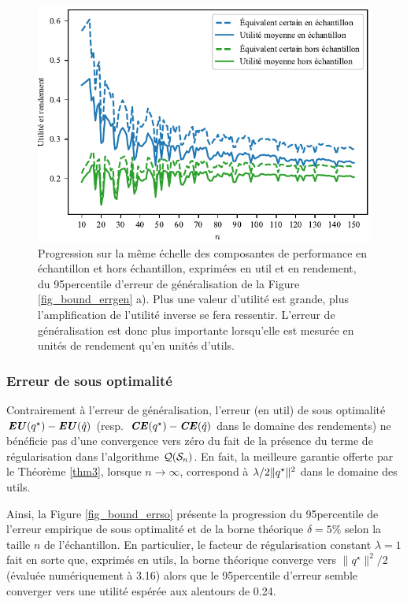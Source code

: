 \begin{figure}[h!]
  \centering
  \includegraphics[width=\textwidth]{../experiments/fig/bound_gencomps.pdf}
  \caption[Composantes de l'erreur maximale]{Progression sur la même échelle des
    composantes de performance en échantillon et hors échantillon, exprimées en util et en
    rendement, du 95\ieme percentile d'erreur de généralisation de la Figure
    \ref{fig_bound_errgen} a). Plus une valeur d'utilité est grande, plus l'amplification
    de l'utilité inverse se fera ressentir. L'erreur de généralisation est donc plus
    importante lorsqu'elle est mesurée en unités de rendement qu'en unités d'utils.  }
  \label{fig_bound_gencomps}
\end{figure}

\clearpage


\subsubsection{Erreur de sous optimalité}

Contrairement à l'erreur de généralisation, l'erreur (en util) de sous optimalité
$\operatorname{\mbox{\textbf{\textit{EU}}}}(q^\star) - \operatorname{\mbox{\textbf{\textit{EU}}}}(\hat q)$ (resp.~$\operatorname{\mbox{\textbf{\textit{CE}}}}(q^\star) - \operatorname{\mbox{\textbf{\textit{CE}}}}(\hat q)$ dans le domaine des rendements) ne
bénéficie pas d'une convergence vers zéro du fait de la présence du terme de
régularisation dans l'algorithme $\mathcal{Q}(\mathcal S_n)$. En fait, la meilleure garantie offerte par
le Théorème \ref{thm3}, lorsque $n\to\infty$, correspond à $\lambda/2\|q^\star\|^2$ dans le domaine des
utils.

Ainsi, la Figure \ref{fig_bound_errso} présente la progression du 95\ieme percentile de
l'erreur empirique de sous optimalité et de la borne théorique $\delta = 5\%$ selon la taille
$n$ de l'échantillon. En particulier, le facteur de régularisation constant $\lambda = 1$ fait
en sorte que, exprimés en utils, la borne théorique converge vers $\|q^\star\|^2/2$ (évaluée
numériquement à \num{3.16}) alors que le 95\ieme percentile d'erreur semble converger vers
une utilité espérée aux alentours de \num{0.24}.

